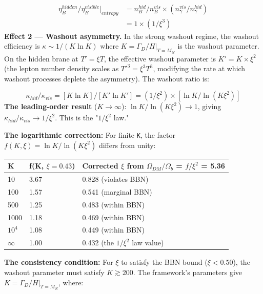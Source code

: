 \documentclass[aps,prd,preprint,superscriptaddress,longbibliography]{revtex4-2}
\begin{document}
\begin{align}
    \eta_B^{hidden} / \eta_B^{visible}|_{entropy} &= n_B^{hid}/n_B^{vis} \times (n_\gamma^{vis}/n_\gamma^{hid}) \\
    & = 1 \times (1/\xi^{3})
\end{align}
\textbf{Effect 2 --- Washout asymmetry.} In the strong washout regime, the washout efficiency is $\kappa \sim  1/(K \ln K)$ where $K = \Gamma_D / H|_{T=M_N}$ is the washout parameter. On the hidden brane at $T' = \xi T$, the effective washout parameter is $K' = K \times \xi^{2}$ (the lepton number density scales as $T'^{3} = \xi^{3}T^{3}$, modifying the rate at which washout processes deplete the asymmetry). The washout ratio is:


\begin{equation}
    \kappa_{hid} / \kappa_{vis} = [K \ln K] / [K' \ln K'] = (1/\xi^{2}) \times [\ln K / \ln(K\xi^{2})]
\end{equation}
\textbf{The leading-order result} ($K \to \infty$): $\ln K / \ln(K\xi^{2}) \to 1$, giving $\kappa_{hid}/\kappa_{vis} \to 1/\xi^{2}$. This is the "$1/\xi^{2}$ law."

\textbf{The logarithmic correction:} For finite \texttt{K}, the factor $f(K,\xi) = \ln K / \ln(K\xi^{2})$ differs from unity:


\begin{table}[H]
\begin{ruledtabular}
\begin{tabular}{p{5.0cm}p{5.0cm}p{5.0cm}}
K & f(K, $\xi=0.43$) & Corrected $\xi$ from $\Omega_{DM}/\Omega_b$ = $f/\xi^{2}$ = 5.36 \\
\hline
10 & 3.67 & 0.828 (violates BBN) \\
100 & 1.57 & 0.541 (marginal BBN) \\
500 & 1.25 & 0.483 (within BBN) \\
1000 & 1.18 & 0.469 (within BBN) \\
$10^{4}$ & 1.08 & 0.449 (within BBN) \\
$\infty$ & 1.00 & 0.432 (the $1/\xi^{2}$ law value) \\
\end{tabular}
\end{ruledtabular}
\end{table}

\textbf{The consistency condition:} For $\xi$ to satisfy the BBN bound ($\xi < 0.50$), the washout parameter must satisfy $K \gtrsim 200$. The framework's parameters give $K = \Gamma_D / H|_{T=M_N}$, where:
\end{document}
